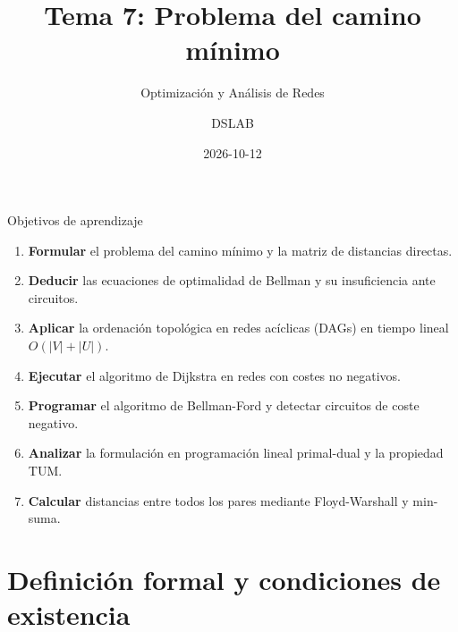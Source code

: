 \documentclass[
  ignorenonframetext,
]{beamer}
\title{Tema 7: Problema del camino mínimo}
\subtitle{Optimización y Análisis de Redes}
\author{DSLAB}
\date{2026-10-12}
\providecommand{\tightlist}{%
  \setlength{\itemsep}{0pt}\setlength{\parskip}{0pt}}
\begin{document}
\frame{\titlepage}


\begin{frame}{Objetivos de aprendizaje}
\label{objetivos-de-aprendizaje}
\begin{enumerate}
\tightlist
\item
  \textbf{Formular} el problema del camino mínimo y la matriz de
  distancias directas.
\item
  \textbf{Deducir} las ecuaciones de optimalidad de Bellman y su
  insuficiencia ante circuitos.
\item
  \textbf{Aplicar} la ordenación topológica en redes acíclicas (DAGs) en
  tiempo lineal \(O(|V| + |U|)\).
\item
  \textbf{Ejecutar} el algoritmo de Dijkstra en redes con costes no
  negativos.
\item
  \textbf{Programar} el algoritmo de Bellman-Ford y detectar circuitos
  de coste negativo.
\item
  \textbf{Analizar} la formulación en programación lineal primal-dual y
  la propiedad TUM.
\item
  \textbf{Calcular} distancias entre todos los pares mediante
  Floyd-Warshall y min-suma.
\end{enumerate}
\end{frame}

\section{Definición formal y condiciones de
existencia}\label{definiciuxf3n-formal-y-condiciones-de-existencia}
\end{document}
